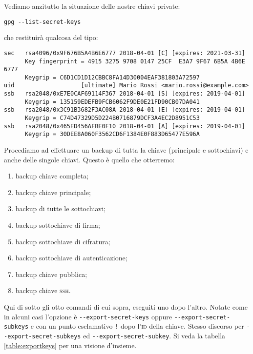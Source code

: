Vediamo anzitutto la situazione delle nostre chiavi private:

\begin{lstlisting}
gpg --list-secret-keys
\end{lstlisting}

che restituirà qualcosa del tipo:

\begin{lstlisting}
sec   rsa4096/0x9F676B5A4B6E6777 2018-04-01 [C] [expires: 2021-03-31]
      Key fingerprint = 4915 3275 9708 0147 25CF  E3A7 9F67 6B5A 4B6E 6777
      Keygrip = C6D1CD1D12CBBC8FA14D30004EAF381803A72597
uid                   [ultimate] Mario Rossi <mario.rossi@example.com>
ssb   rsa2048/0xE7E0CAF69114F367 2018-04-01 [S] [expires: 2019-04-01]
      Keygrip = 135159EDEFB9FCB6062F9DE0E21FD90CB07DA041
ssb   rsa2048/0x3C91B3682F3AC08A 2018-04-01 [E] [expires: 2019-04-01]
      Keygrip = C74D47329D5D224B0716879DCF3A4EC2D8951C53
ssb   rsa2048/0x465ED456AFBE0F10 2018-04-01 [A] [expires: 2019-04-01]
      Keygrip = 30DEE8A060F3562CD6F1384E0F883D65477E596A
\end{lstlisting}

Procediamo ad effettuare un backup di tutta la chiave (principale e sottochiavi)
e anche delle singole chiavi. Questo è quello che otterremo:

\begin{enumerate}
 \item backup chiave completa;
 \item backup chiave principale;
 \item backup di tutte le sottochiavi;
 \item backup sottochiave di firma;
 \item backup sottochiave di cifratura;
 \item backup sottochiave di autenticazione;
 \item backup chiave pubblica;
 \item backup chiave \textsc{ssh}.
\end{enumerate}

Qui di sotto gli otto comandi di cui sopra, eseguiti uno dopo l'altro. Notate
come in alcuni casi l'opzione è \verb+--export-secret-keys+ oppure
\verb+--export-secret-subkeys+ e con un punto esclamativo
\texttt{!} dopo l'\textsc{id} della chiave. Stesso discorso per
\verb+--export-secret-subkeys+ ed \verb+--export-secret-subkey+. Si veda la
tabella \vref{table:exportkeys} per una visione d'insieme.

